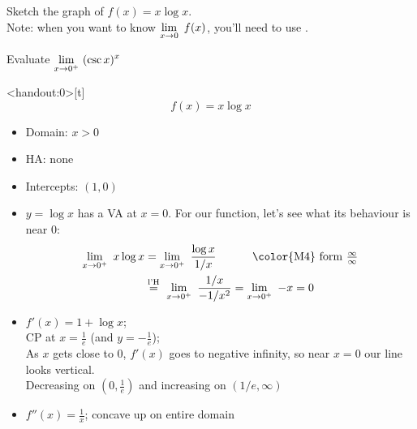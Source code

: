 \begin{frame}[t]


Sketch the graph of $f(x)=x\log x$.\\

Note: when you want to know $\displaystyle\displaystyle\lim_{x \to 0}~ f(x)$, you'll need to use \hosp.

\vfill
Evaluate $\displaystyle\displaystyle\lim_{x \to 0^+}~(\csc x)^{x}$
\end{frame}

\begin{frame}<handout:0>[t]
\[f(x)=x\log x\]\pause\color{answercolor}

\begin{itemize}\color{answercolor}
\item Domain: $x>0$
\item HA: none
\item Intercepts: $(1,0)$
\item $y=\log x$ has a VA at $x=0$. For our function, let's see what its behaviour is near 0:
\begin{align*}
\dlimx{0^+} x\log x&=\dlimx{0^+}\frac{\log x}{1/x} \hspace{1cm}\mbox{ \color{M4} form $\frac{\infty}{\infty}$}\\
&\lheq\dlimx{0^+} \frac{1/x}{-1/x^2}=\dlimx{0^+}-x=0
\end{align*}
\item $f'(x) = 1+\log x$;\\ CP at $x=\frac1e$ (and $y=-\frac1e$);\\
 As $x$ gets close to 0, $f'(x)$ goes to negative infinity, so near $x=0$ our line looks vertical.\\
Decreasing on $(0,\frac1e)$ and increasing on $(1/e,\infty)$
\item $f''(x)=\frac1x$; concave up on entire domain
\end{itemize}
\end{frame}


